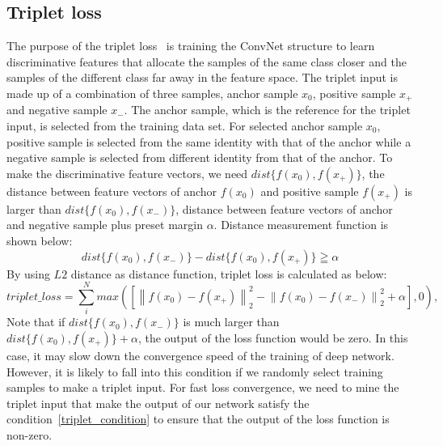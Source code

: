 \subsection{Triplet loss}
The purpose of the triplet loss~\cite{hoffer2015deep} is training the ConvNet structure to learn discriminative features that allocate the samples of the same class closer and the samples of the different class far away in the feature space.
The triplet input is made up of a combination of three samples, anchor sample $x_0$, positive sample $x_+$ and negative sample $x_-$. The anchor sample, which is the reference for the triplet input, is selected from the training data set. For selected anchor sample $x_0$, positive sample is selected from the same identity with that of the anchor while a negative sample is selected from different identity from that of the anchor.
To make the discriminative feature vectors, we need $dist\{f(x_0),f(x_+)\}$, the distance  between feature vectors of anchor $f(x_0)$ and positive sample $f(x_+)$ is larger than $dist\{f(x_0),f(x_-)\}$, distance between feature vectors of anchor and negative sample  plus preset margin $\alpha$. 
Distance measurement function is shown below:
\begin{equation}
    dist\{f(x_0),f(x_-)\} - dist\{f(x_0),f(x_+)\} \geqq \alpha
    \label{triplet_condition}
\end{equation}
By using $L2$ distance as distance function, triplet loss is calculated as below:
\begin{equation}
    triplet\_loss = \sum_i^N max\left({ \left[ {\left\| {{f(x_0)} - {f(x_+)}} \right\|_2^2} - {\left\| {{f(x_0)} - {f(x_-)}} \right\|_2^2}  + \alpha \right]},0 \right),
    \label{triplet_loss}
\end{equation}
Note that if $dist\{f(x_0),f(x_-)\}$ is much larger than $dist\{f(x_0),f(x_+)\} + \alpha$, the output of the loss function would be zero. In this case, it may slow down the convergence speed of the training of deep network. However, it is likely to fall into this condition if we randomly select training samples to make a triplet input. For fast loss convergence, we need to mine the triplet input that make the output of our network satisfy the condition~\ref{triplet_condition} to ensure that the output of the loss function is non-zero.

